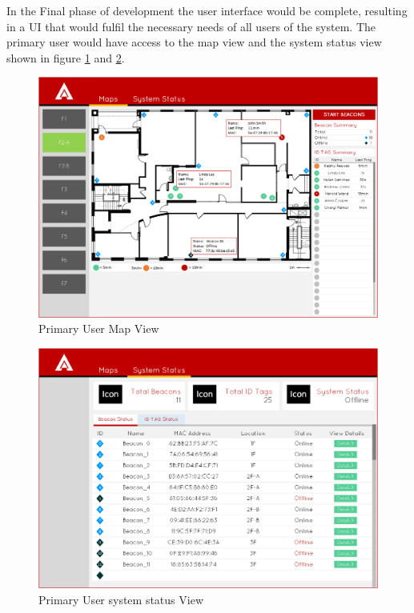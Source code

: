 \pagebreak

In the Final phase of development the user interface would be complete, resulting in a UI that would fulfil the necessary needs of all users of the system. The primary user would have access to the map view and the system status view shown in figure \ref{map_ff} and \ref{ss_ff}.

\medskip
\begin{figure}[H]
\centering
    \includegraphics[scale=0.45]{./images/UIMU_map_ff.png}
    \caption{Primary User Map View}
    \label{map_ff}
\end{figure}

\begin{figure}[H]
\centering
    \includegraphics[scale=0.45]{./images/UIMU_status_ff.png}
    \caption{Primary User system status View}
    \label{ss_ff}
\end{figure}
\medskip

